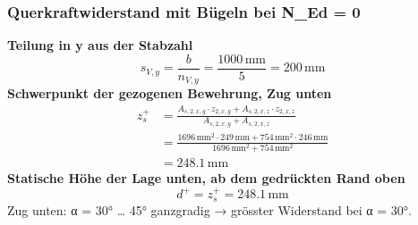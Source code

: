 \documentclass[11pt,a4paper]{article}
\begin{document}
\subsubsection{Querkraftwiderstand mit Bügeln bei N\_Ed = 0}
\noindent\textbf{Teilung in y aus der Stabzahl}
\begin{equation*}
s_{V,y} = \frac{b}{n_{V,y}} = \frac{1000\,\mathrm{mm}}{5} = 200\,\mathrm{mm}
\end{equation*}
\noindent\textbf{Schwerpunkt der gezogenen Bewehrung, Zug unten}
\begin{equation*}
\begin{aligned}
  z_s^{+} &= \frac{A_{s,2,x,g} \cdot z_{2,x,g} + A_{s,2,x,z} \cdot z_{2,x,z}}{A_{s,2,x,g} + A_{s,2,x,z}} \\
  &= \frac{1696\,\mathrm{mm}^{2} \cdot 249\,\mathrm{mm} + 754\,\mathrm{mm}^{2} \cdot 246\,\mathrm{mm}}{1696\,\mathrm{mm}^{2} + 754\,\mathrm{mm}^{2}} \\
  &= 248.1\,\mathrm{mm}
\end{aligned}
\end{equation*}
\noindent\textbf{Statische Höhe der Lage unten, ab dem gedrückten Rand oben}
\begin{equation*}
d^{+} = z_s^{+} = 248.1\,\mathrm{mm}
\end{equation*}
Zug unten: α = 30° … 45° ganzgradig → grösster Widerstand bei α = 30°.
\end{document}
